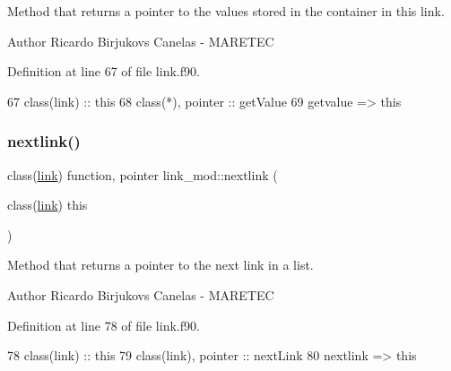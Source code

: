 Method that returns a pointer to the values stored in the container in this link. 

\begin{DoxyAuthor}{Author}
Ricardo Birjukovs Canelas -\/ M\+A\+R\+E\+T\+EC 
\end{DoxyAuthor}


Definition at line 67 of file link.\+f90.


\begin{DoxyCode}
67     \textcolor{keywordtype}{class}(link) :: this
68     \textcolor{keywordtype}{class}(*), \textcolor{keywordtype}{pointer} :: getValue
69     getvalue => this%
\end{DoxyCode}
\mbox{\label{namespacelink__mod_a2d776121ed0138aba8b3d166938c964f}} 
\subsubsection{\texorpdfstring{nextlink()}{nextlink()}}
{\footnotesize\ttfamily class(\mbox{\hyperlink{structlink__mod_1_1link}{link}}) function, pointer link\+\_\+mod\+::nextlink (\begin{DoxyParamCaption}\item[{class(\mbox{\hyperlink{structlink__mod_1_1link}{link}})}]{this }\end{DoxyParamCaption})\hspace{0.3cm}{\ttfamily [private]}}



Method that returns a pointer to the next link in a list. 

\begin{DoxyAuthor}{Author}
Ricardo Birjukovs Canelas -\/ M\+A\+R\+E\+T\+EC 
\end{DoxyAuthor}


Definition at line 78 of file link.\+f90.


\begin{DoxyCode}
78     \textcolor{keywordtype}{class}(link) :: this
79     \textcolor{keywordtype}{class}(link), \textcolor{keywordtype}{pointer} :: nextLink
80     nextlink => this%
\end{DoxyCode}
\mbox{\label{namespacelink__mod_a2d23022ef22049f8340099b6960d8d5d}} 
